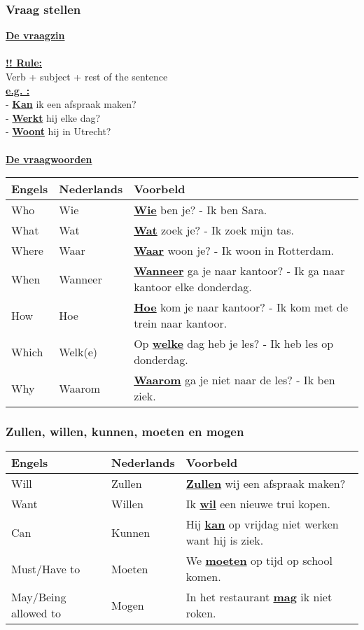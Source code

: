 \documentclass[a4paper,14pt]{extarticle}
\newcommand{\attention}[1]{\underline{\textbf{!! #1}}}
\newcommand{\emp}[1]{\underline{\textbf{#1}}}
\begin{document}
\subsubsection{Vraag stellen}
\emp{De vraagzin} \\ \\
\attention{Rule:} \\
Verb + subject + rest of the sentence \\
\emp{e.g. :} \\
- \emp{Kan} ik een afspraak maken? \\
- \emp{Werkt} hij elke dag? \\ 
- \emp{Woont} hij in Utrecht?\\ \\
\emp{De vraagwoorden} 
\begin{center}
\begin{tabularx}{\textwidth}{ l l p{350pt} }
 \hline
 Engels & Nederlands & Voorbeld \\
 \hline
 Who & Wie & \emp{Wie} ben je? - Ik ben Sara. \\
 What & Wat & \emp{Wat} zoek je? - Ik zoek mijn tas. \\
 Where & Waar & \emp{Waar} woon je? - Ik woon in Rotterdam. \\
 When & Wanneer & \emp{Wanneer} ga je naar kantoor? - Ik ga naar kantoor elke donderdag. \\
 How & Hoe & \emp{Hoe} kom je naar kantoor? - Ik kom met de trein naar kantoor. \\
 Which & Welk(e) & Op \emp{welke} dag heb je les? - Ik heb les op donderdag. \\
 Why & Waarom & \emp{Waarom} ga je niet naar de les? - Ik ben ziek.
\end{tabularx}
\end{center}
\newpage
\subsubsection{Zullen, willen, kunnen, moeten en mogen}
\begin{center}
\begin{tabularx}{\textwidth}{ l l p{350pt} }
 \hline
 Engels & Nederlands & Voorbeld \\
 \hline
 Will & Zullen & \emp{Zullen} wij een afspraak maken? \\
 Want & Willen & Ik \emp{wil} een nieuwe trui kopen. \\
 Can  & Kunnen & Hij \emp{kan} op vrijdag niet werken want hij is ziek. \\
 Must/Have to & Moeten & We \emp{moeten} op tijd op school komen. \\
 May/Being allowed to & Mogen & In het restaurant \emp{mag} ik niet roken. \\
\end{tabularx}
\end{center}
\end{document}
